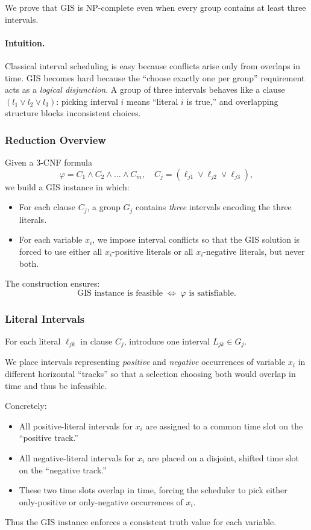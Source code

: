 \documentclass[9pt]{extarticle}
\begin{document}
We prove that GIS is NP-complete even when every group contains at least
three intervals.

\paragraph{Intuition.}
Classical interval scheduling is easy because conflicts arise only from
overlaps in time.  
GIS becomes hard because the “choose exactly one per group” requirement acts
as a \emph{logical disjunction}.  
A group of three intervals behaves like a clause $(l_1 \lor l_2 \lor l_3)$:
picking interval $i$ means “literal $i$ is true,” and overlapping structure
blocks inconsistent choices.

\subsubsection*{Reduction Overview}

Given a 3-CNF formula
\[
\varphi = C_1 \land C_2 \land \dots \land C_m,
\quad C_j = (\ell_{j1} \lor \ell_{j2} \lor \ell_{j3}),
\]
we build a GIS instance in which:
\begin{itemize}
    \item For each clause $C_j$, a group $G_j$ contains \emph{three} intervals
          encoding the three literals.
    \item For each variable $x_i$, we impose interval conflicts so that the GIS
          solution is forced to use either all $x_i$-positive literals or all
          $x_i$-negative literals, but never both.
\end{itemize}

The construction ensures:
\[
\text{GIS instance is feasible} 
\;\Longleftrightarrow\;
\varphi \text{ is satisfiable.}
\]

\subsubsection*{Literal Intervals}

For each literal $\ell_{jk}$ in clause $C_j$, introduce one interval
$L_{jk} \in G_j$.

We place intervals representing \emph{positive} and \emph{negative} occurrences
of variable $x_i$ in different horizontal “tracks” so that a selection choosing
both would overlap in time and thus be infeasible.

Concretely:
\begin{itemize}
    \item All positive-literal intervals for $x_i$ are assigned to a common
          time slot on the “positive track.”
    \item All negative-literal intervals for $x_i$ are placed on a disjoint,
          shifted time slot on the “negative track.”
    \item These two time slots overlap in time, forcing the scheduler to pick
          either only-positive or only-negative occurrences of $x_i$.
\end{itemize}
Thus the GIS instance enforces a consistent truth value for each variable.
\end{document}
